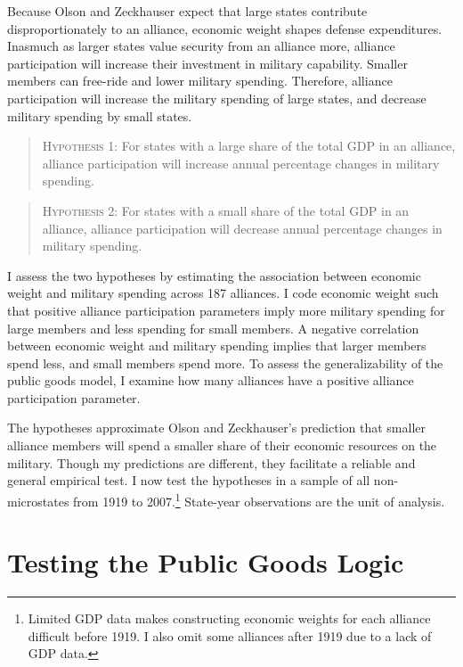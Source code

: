 \documentclass[12pt]{article}
\begin{document}
Because Olson and Zeckhauser expect that large states contribute disproportionately to an alliance, economic weight shapes defense expenditures. 
Inasmuch as larger states value security from an alliance more, alliance participation will increase their investment in military capability.
Smaller members can free-ride and lower military spending. 
Therefore, alliance participation will increase the military spending of large states, and decrease military spending by small states. 


\begin{quote}
\textsc{Hypothesis 1}: For states with a large share of the total GDP in an alliance, alliance participation will increase annual percentage changes in military spending. 
\end{quote}


\begin{quote}
\textsc{Hypothesis 2}: For states with a small share of the total GDP in an alliance, alliance participation will decrease annual percentage changes in military spending.
\end{quote}


I assess the two hypotheses by estimating the association between economic weight and military spending across 187 alliances. 
I code economic weight such that positive alliance participation parameters imply more military spending for large members and less spending for small members. 
A negative correlation between economic weight and military spending implies that larger members spend less, and small members spend more. 
To assess the generalizability of the public goods model, I examine how many alliances have a positive alliance participation parameter.  
 

The hypotheses approximate Olson and Zeckhauser's prediction that smaller alliance members will spend a smaller share of their economic resources on the military. 
Though my predictions are different, they facilitate a reliable and general empirical test.
I now test the hypotheses in a sample of all non-microstates from 1919 to 2007.\footnote{Limited GDP data makes constructing economic weights for each alliance difficult before 1919. I also omit some alliances after 1919 due to a lack of GDP data.}
State-year observations are the unit of analysis.


\section{Testing the Public Goods Logic}
\end{document}
